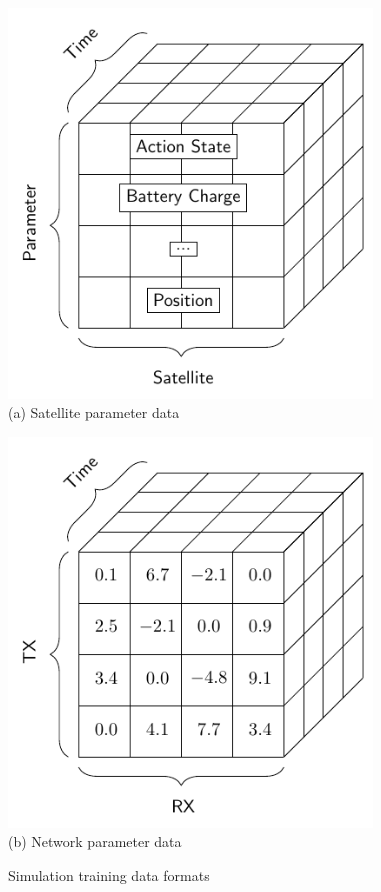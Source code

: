 \documentclass[conference]{IEEEtran}
\begin{document}
\begin{figure}[b]
  \begin{minipage}[b]{0.49\linewidth}
    \begin{center}
      \includegraphics[width=0.86\textwidth]{images/params.pdf} \\
      {\footnotesize(a) Satellite parameter data}
    \end{center}
  \end{minipage}
  \begin{minipage}[b]{0.49\linewidth}
    \begin{center}
      \includegraphics[width=0.86\textwidth]{images/weighted.pdf} \\
      {\footnotesize(b) Network parameter data}
    \end{center}
  \end{minipage}
  \caption{Simulation training data formats}
  \label{fig:data}
\end{figure}
\end{document}
